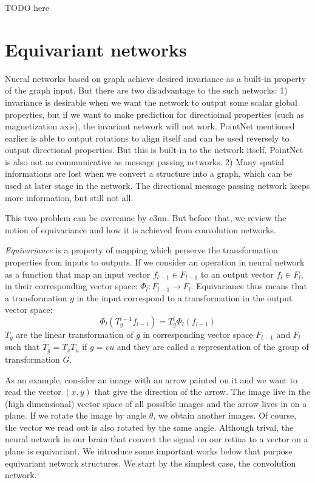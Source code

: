\documentclass{IEEEtran}
\begin{document}
TODO here

\section{Equivariant networks}
Nueral networks based on graph achieve desired invariance as a built-in property of the graph input.  
But there are two disadvantage to the such networks: 
1) invariance is desirable when we want the network to output some scalar global properties, but if we 
want to make prediction for directioinal properties (such as magnetization axis), the invariant network 
will not work. PointNet mentioned earlier is able to output rotations to align itself and can be used 
reversely to output directional properties. But this is built-in to the network itself. PointNet is 
also not as communicative as message passing networks.
2) Many spatial informations are lost when we convert a structure into a graph, which can be used 
at later stage in the network. The directional message passing network keeps more information, but 
still not all.

This two problem can be overcame by e3nn. But before that, we review the notion of equivariance
and how it is achieved from convolution networks.

\emph{Equivariance} is a property of mapping which perserve the transformation properties from inputs 
to outputs. If we consider an operation in neural network as a function that map an input vector 
$f_{l-1}\in F_{l-1}$ to an output vector $f_l \in F_l$, in their corresponding vector space: 
$\Phi_l\colon F_{l-1} \to F_{l}$. Equivariance thus means that a transformation $g$ in the input 
correspond to a transformation in the output vector space:
\begin{equation}
    \Phi_l (T^{l-1}_g f_{l-1}) = T^l_g \Phi_l (f_{l-1}) \label{E:equivariant_condition}
\end{equation}
$T_g$ are the linear transformation of $g$ in corresponding vector space $F_{l-1}$ and $F_l$ such that 
$T_{g} = T_v T_u$ if $g = vu$ and they are called a representation of the group of transformation $G$.

As an example, consider an image with an arrow painted on it and we want to read the vector $(x,y)$ that 
give the direction of the arrow. The image live in the (high dimensional) vector space of 
all possible images and the arrow lives in on a plane. If we rotate the image by angle $\theta$, we 
obtain another images. Of course, the vector we read out is also rotated by the same angle. Although 
trival, the neural network in our brain that convert the signal on our retina to a vector on a plane 
is equivariant. We introduce some important works below that purpose equivariant network structures. 
We start by the simplest case, the convolution network. 
\end{document}
